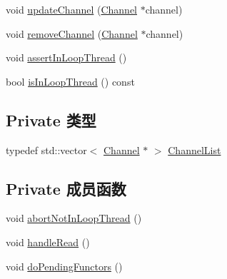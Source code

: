 \begin{DoxyCompactItemize}
\item 
void \hyperlink{classmuduo_1_1EventLoop_acaa4a191936aacf608d279a6f343d533}{update\+Channel} (\hyperlink{classmuduo_1_1Channel}{Channel} $\ast$channel)
\item 
void \hyperlink{classmuduo_1_1EventLoop_ab10f76c92cb5269f8296e5b3e4dd0ef9}{remove\+Channel} (\hyperlink{classmuduo_1_1Channel}{Channel} $\ast$channel)
\item 
void \hyperlink{classmuduo_1_1EventLoop_a9e9c23193ece3ba25a1a2779fc7ebc2d}{assert\+In\+Loop\+Thread} ()
\item 
bool \hyperlink{classmuduo_1_1EventLoop_a1da5ae1e094c0136136b5344ef7a3b66}{is\+In\+Loop\+Thread} () const
\end{DoxyCompactItemize}
\subsection*{Private 类型}
\begin{DoxyCompactItemize}
\item 
typedef std\+::vector$<$ \hyperlink{classmuduo_1_1Channel}{Channel} $\ast$ $>$ \hyperlink{classmuduo_1_1EventLoop_a0b74248ffee6df294563618187b52404}{Channel\+List}
\end{DoxyCompactItemize}
\subsection*{Private 成员函数}
\begin{DoxyCompactItemize}
\item 
void \hyperlink{classmuduo_1_1EventLoop_a6375a5e33170fe1ee0fcb82c68b684ba}{abort\+Not\+In\+Loop\+Thread} ()
\item 
void \hyperlink{classmuduo_1_1EventLoop_a231ec0ec0313193a59b3f1326328ae50}{handle\+Read} ()
\item 
void \hyperlink{classmuduo_1_1EventLoop_a52b9d01f6df5ea016514b924abda1299}{do\+Pending\+Functors} ()
\end{DoxyCompactItemize}
